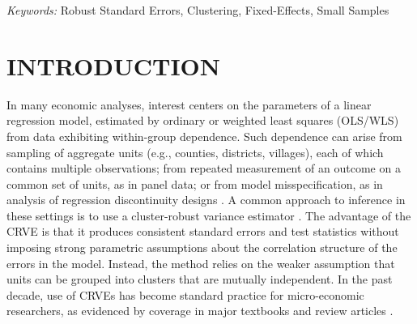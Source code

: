 \documentclass[12pt]{article}\usepackage[]{graphicx}\usepackage[]{color}
\begin{document}
\noindent%
{\it Keywords:} Robust Standard Errors, Clustering, Fixed-Effects, Small Samples
\vfill

\newpage
{} %


\section{INTRODUCTION}
\label{sec:intro}

In many economic analyses, interest centers on the parameters of a linear regression model, estimated by ordinary or weighted least squares (OLS/WLS) from data exhibiting within-group dependence. 
Such dependence can arise from sampling of aggregate units (e.g., counties, districts, villages), each of which contains multiple observations; from repeated measurement of an outcome on a common set of units, as in panel data; or from model misspecification, as in analysis of regression discontinuity designs \citep[e.g.,][]{Lee2008regression}. 
A common approach to inference in these settings is to use a cluster-robust variance estimator \citep[CRVE;][]{Arellano1987computing, Liang1986longitudinal, white1984asymptotic}.
The advantage of the CRVE is that it produces consistent standard errors and test statistics without imposing strong parametric assumptions about the correlation structure of the errors in the model.
Instead, the method relies on the weaker assumption that units can be grouped into clusters that are mutually independent. 
In the past decade, use of CRVEs has become standard practice for micro-economic researchers, as evidenced by coverage in major textbooks and review articles \citep[e.g.,][]{Wooldridge2010econometric, Angrist2009mostly, Cameron2015practitioners}.
\end{document}
